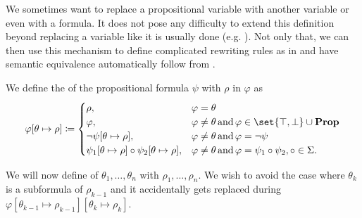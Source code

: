\begin{definition}\label{def:propositional_substitution}
  We sometimes want to replace a propositional variable with another variable or even with a formula. It does not pose any difficulty to extend this definition beyond replacing a variable like it is usually done (e.g. \cite[def. 7.8]{OpenLogic20201202}). Not only that, we can then use this mechanism to define complicated rewriting rules as in  and have semantic equivalence automatically follow from .

  \begin{thmenum}
     We define the  of the propositional formula \( \psi \) with \( \rho \) in \( \varphi \) as
    \begin{equation}\label{eq:def:propositional_substitution/single}
      \varphi[\theta \mapsto \rho] \coloneqq \begin{cases}
        \rho,                                                          &\varphi = \theta \\
        \varphi,                                                       &\varphi \neq \theta \T{and} \varphi \in \set{ \top, \bot } \cup \boldop{Prop} \\
        \neg \psi[\theta \mapsto \rho],                                &\varphi \neq \theta \T{and} \varphi = \neg \psi \\
        \psi_1[\theta \mapsto \rho] \circ \psi_2[\theta \mapsto \rho], &\varphi \neq \theta \T{and} \varphi = \psi_1 \circ \psi_2, \circ \in \Sigma.
      \end{cases}
    \end{equation}

     We will now define  of \( \theta_1, \ldots, \theta_n \) with \( \rho_1, \ldots, \rho_n \). We wish to avoid the case where \( \theta_k \) is a subformula of \( \rho_{k-1} \) and it accidentally gets replaced during \( \varphi[\theta_{k-1} \mapsto \rho_{k-1}][\theta_k \mapsto \rho_k] \).


\end{thmenum}
\end{definition}
